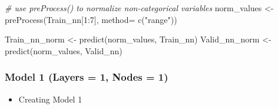 \documentclass[
]{article}
\newenvironment{Shaded}{\begin{snugshade}}{\end{snugshade}}
\newcommand{\AttributeTok}[1]{\textcolor[rgb]{0.77,0.63,0.00}{#1}}
\newcommand{\CommentTok}[1]{\textcolor[rgb]{0.56,0.35,0.01}{\textit{#1}}}
\newcommand{\DecValTok}[1]{\textcolor[rgb]{0.00,0.00,0.81}{#1}}
\newcommand{\FunctionTok}[1]{\textcolor[rgb]{0.00,0.00,0.00}{#1}}
\newcommand{\NormalTok}[1]{#1}
\newcommand{\OtherTok}[1]{\textcolor[rgb]{0.56,0.35,0.01}{#1}}
\newcommand{\SpecialCharTok}[1]{\textcolor[rgb]{0.00,0.00,0.00}{#1}}
\newcommand{\StringTok}[1]{\textcolor[rgb]{0.31,0.60,0.02}{#1}}
\providecommand{\tightlist}{%
  \setlength{\itemsep}{0pt}\setlength{\parskip}{0pt}}
\begin{document}
\begin{Shaded}
\begin{Highlighting}[]
\CommentTok{\# use preProcess() to normalize non{-}categorical variables}
\NormalTok{norm\_values }\OtherTok{\textless{}{-}} \FunctionTok{preProcess}\NormalTok{(Train\_nn[}\DecValTok{1}\SpecialCharTok{:}\DecValTok{7}\NormalTok{], }\AttributeTok{method=} \FunctionTok{c}\NormalTok{(}\StringTok{"range"}\NormalTok{))}

\NormalTok{Train\_nn\_norm }\OtherTok{\textless{}{-}} \FunctionTok{predict}\NormalTok{(norm\_values, Train\_nn)}
\NormalTok{Valid\_nn\_norm }\OtherTok{\textless{}{-}} \FunctionTok{predict}\NormalTok{(norm\_values, Valid\_nn)}
\end{Highlighting}
\end{Shaded}

\hypertarget{model-1-layers-1-nodes-1}{%
\subsubsection{Model 1 (Layers = 1, Nodes =
1)}\label{model-1-layers-1-nodes-1}}

\begin{itemize}
\tightlist
\item
  Creating Model 1
\end{itemize}
\end{document}
